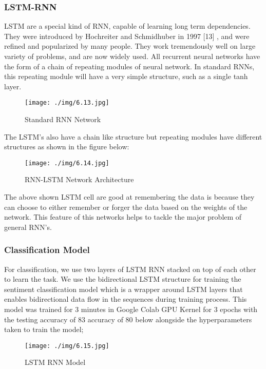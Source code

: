             \subsubsection{LSTM-RNN}
LSTM are a special kind of RNN, capable of learning long term dependencies. They
were introduced by Hochreiter and Schmidhuber in 1997
[13]
, and were refined and
popularized by many people. They work tremendously well on large variety of
problems, and are now widely used. All recurrent neural networks have the form of a
chain of repeating modules of neural network. In standard RNNs, this repeating module
will have a very simple structure, such as a single tanh layer.
        \begin{figure}[hbt!]
            \centering
                \texttt{[image: ./img/6.13.jpg]}
                \caption{Standard RNN Network}
        \end{figure}

The LSTM’s also have a chain like structure but repeating modules have different
structures as shown in the figure below:

        \begin{figure}[hbt!]
            \centering
                \texttt{[image: ./img/6.14.jpg]}
                \caption{RNN-LSTM Network Architecture}
        \end{figure}
The above shown LSTM cell are good at remembering the data is because they can
choose to either remember or forger the data based on the weights of the network. This
feature of this networks helps to tackle the major problem of general RNN’s.
            \subsubsection{Classification Model}
For classification, we use two layers of LSTM RNN stacked on top of each other to
learn the task. We use the bidirectional LSTM structure for training the sentiment
classification model which is a wrapper around LSTM layers that enables bidirectional
data flow in the sequences during training process. This model was trained for 3 minutes
in Google Colab GPU Kernel for 3 epochs with the testing accuracy of 83%
accuracy of 80%
below alongside the hyperparameters taken to train the model;
        \begin{figure}[hbt!]
            \centering
                \texttt{[image: ./img/6.15.jpg]}
                \caption{LSTM RNN Model}
        \end{figure}
        
